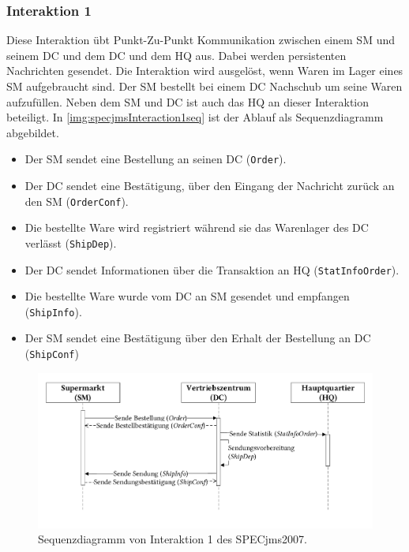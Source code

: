 \subsubsection{Interaktion 1}
\label{sec:interaction1desc}
Diese Interaktion übt Punkt-Zu-Punkt Kommunikation zwischen einem SM und seinem DC und dem DC und dem HQ aus. Dabei werden persistenten Nachrichten gesendet. Die Interaktion wird ausgelöst, wenn Waren im Lager eines SM aufgebraucht sind. Der SM bestellt bei einem DC Nachschub um seine Waren aufzufüllen. Neben dem SM und DC ist auch das HQ an dieser Interaktion beteiligt. In \autoref{img:specjmsInteraction1seq} ist der Ablauf als Sequenzdiagramm abgebildet. 
\begin{itemize}
    \item Der SM sendet eine Bestellung an seinen DC (\texttt{Order}).
    \item Der DC sendet eine Bestätigung, über den Eingang der Nachricht zurück an den SM (\texttt{OrderConf}).
    \item Die bestellte Ware wird registriert während sie das Warenlager des DC verlässt (\texttt{ShipDep}).
    \item Der DC sendet Informationen über die Transaktion an HQ (\texttt{StatInfoOrder}).
    \item Die bestellte Ware wurde vom DC an SM gesendet und empfangen (\texttt{ShipInfo}).
    \item Der SM sendet eine Bestätigung über den Erhalt der Bestellung an DC (\texttt{ShipConf})
\end{itemize}

\begin{figure}
\center
  \includegraphics[width=1\textwidth]{images/evaluation/specjms/evaluationInteraktion1seq.pdf}
  \caption{Sequenzdiagramm von Interaktion 1 des SPECjms2007.}
  \label{img:specjmsInteraction1seq}
\end{figure}

